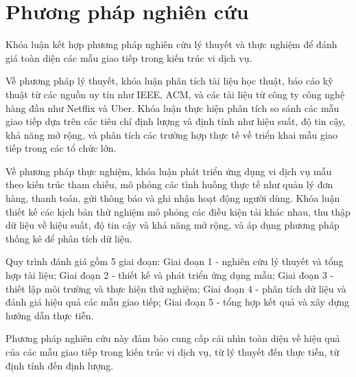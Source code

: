 \section{Phương pháp nghiên cứu}
Khóa luận kết hợp phương pháp nghiên cứu lý thuyết và thực nghiệm để đánh giá toàn diện các mẫu giao tiếp trong kiến trúc vi dịch vụ.

Về phương pháp lý thuyết, khóa luận phân tích tài liệu học thuật, báo cáo kỹ thuật từ các nguồn uy tín như IEEE, ACM, và các tài liệu từ công ty công nghệ hàng đầu như Netflix và Uber. Khóa luận thực hiện phân tích so sánh các mẫu giao tiếp dựa trên các tiêu chí định lượng và định tính như hiệu suất, độ tin cậy, khả năng mở rộng, và phân tích các trường hợp thực tế về triển khai mẫu giao tiếp trong các tổ chức lớn.

Về phương pháp thực nghiệm, khóa luận phát triển ứng dụng vi dịch vụ mẫu theo kiến trúc tham chiếu, mô phỏng các tình huống thực tế như quản lý đơn hàng, thanh toán, gửi thông báo và ghi nhận hoạt động người dùng. Khóa luận thiết kế các kịch bản thử nghiệm mô phỏng các điều kiện tải khác nhau, thu thập dữ liệu về hiệu suất, độ tin cậy và khả năng mở rộng, và áp dụng phương pháp thống kê để phân tích dữ liệu.

Quy trình đánh giá gồm 5 giai đoạn: Giai đoạn 1 - nghiên cứu lý thuyết và tổng hợp tài liệu; Giai đoạn 2 - thiết kế và phát triển ứng dụng mẫu; Giai đoạn 3 - thiết lập môi trường và thực hiện thử nghiệm; Giai đoạn 4 - phân tích dữ liệu và đánh giá hiệu quả các mẫu giao tiếp; Giai đoạn 5 - tổng hợp kết quả và xây dựng hướng dẫn thực tiễn.

Phương pháp nghiên cứu này đảm bảo cung cấp cái nhìn toàn diện về hiệu quả của các mẫu giao tiếp trong kiến trúc vi dịch vụ, từ lý thuyết đến thực tiễn, từ định tính đến định lượng.